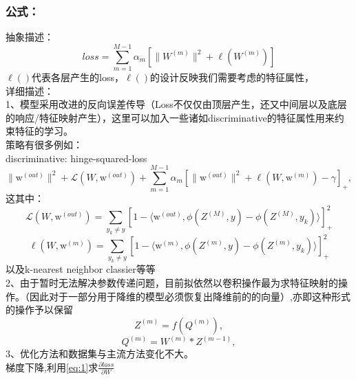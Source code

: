 \documentclass{article}
\begin{document}
\begin{CJK}{UTF8}{gbsn}
\subsubsection{公式：}
抽象描述：\\
\begin{equation}\label{eq:1}
loss=\sum^{M-1}_{m=1}\alpha_m\left[\|W^{(m)}\|^2+\ell(W^{(m)})\right]
\end{equation}
$\ell()$代表各层产生的loss，$\ell()$的设计反映我们需要考虑的特征属性，\\
详细描述：\\
1、模型采用改进的反向误差传导（Loss不仅仅由顶层产生，还又中间层以及底层的响应/特征映射产生），这里可以加入一些诸如discriminative的特征属性用来约束特征的学习。\\
策略有很多例如：\\
discriminative: hinge-squared-loss\cite{lee2014deeply}
\begin{equation}\label{eq:2}
 \|\mathrm{w}^{(out)}\|^2+\mathcal{L}(W,\mathrm{w}^{(out)})+\sum^{M-1}_{m=1}\alpha_m\left[\|\mathrm{w}^{(out)}\|^2+\ell(W,\mathrm{w}^{(m)})-\gamma\right]_+, \end{equation}
这其中：
\begin{equation}
\mathcal{L}(W,\mathrm{w}^{(out)})=\sum_{y_k\neq y}\left[1-\langle\mathrm{w}^{(out)},\phi(Z^{(M)},y)-\phi(Z^{(M)},y_k)\rangle\right]^2_+
\end{equation}
\begin{equation} 
\ell(W,\mathrm{w}^{(m)})=\sum_{y_k\neq y}\left[1-\langle\mathrm{w}^{(m)},\phi(Z^{(m)},y)-\phi(Z^{(m)},y_k)\rangle\right]^2_+
\end{equation}
以及k-nearest neighbor classier等等\\
2、由于暂时无法解决参数传递问题，目前拟依然以卷积操作最为求特征映射的操作。（因此对于一部分用于降维的模型必须恢复出降维前的的向量）,亦即这种形式的操作予以保留\\
\begin{equation} Z^{(m)}=f(Q^{(m)}), \end{equation}
\begin{equation} Q^{(m)}=W^{(m)}\ast Z^{(m-1)}, \end{equation}
3、优化方法和数据集与主流方法变化不大。\\
梯度下降,利用\eqref{eq:1}求$\frac{\partial{loss}}{\partial{W}}$

\end{CJK}
\end{document}

